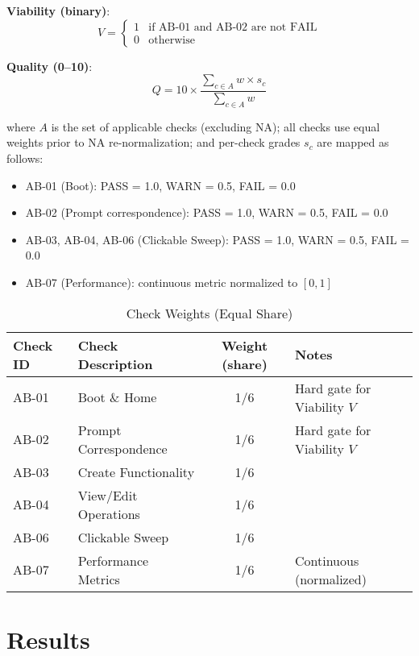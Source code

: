 \documentclass{article}
\begin{document}
\textbf{Viability (binary)}:
\begin{equation}
V = \begin{cases}
1 & \text{if AB-01 and AB-02 are not FAIL} \\
0 & \text{otherwise}
\end{cases}
\end{equation}

\textbf{Quality (0--10)}:
\begin{equation}
Q = 10 \times \frac{\sum_{c \in A} w \times s_c}{\sum_{c \in A} w}
\end{equation}

where $A$ is the set of applicable checks (excluding NA); all checks use equal weights prior to NA re-normalization; and per-check grades $s_c$ are mapped as follows:
\begin{itemize}
\item AB-01 (Boot): PASS = 1.0, WARN = 0.5, FAIL = 0.0
\item AB-02 (Prompt correspondence): PASS = 1.0, WARN = 0.5, FAIL = 0.0
\item AB-03, AB-04, AB-06 (Clickable Sweep): PASS = 1.0, WARN = 0.5, FAIL = 0.0
\item AB-07 (Performance): continuous metric normalized to $[0,1]$
\end{itemize}

\begin{table}[t]
\caption{Check Weights (Equal Share)}
\label{tab:check-weights}
\centering
\begin{tabular}{llcl}
\toprule
Check ID & Check Description & Weight (share) & Notes \\
\midrule
AB-01 & Boot \& Home & 1/6 & Hard gate for Viability $V$ \\
AB-02 & Prompt Correspondence & 1/6 & Hard gate for Viability $V$ \\
AB-03 & Create Functionality & 1/6 & \\
AB-04 & View/Edit Operations & 1/6 & \\
AB-06 & Clickable Sweep & 1/6 & \\
AB-07 & Performance Metrics & 1/6 & Continuous (normalized) \\
\bottomrule
\end{tabular}
\end{table}

\section{Results}
\end{document}
